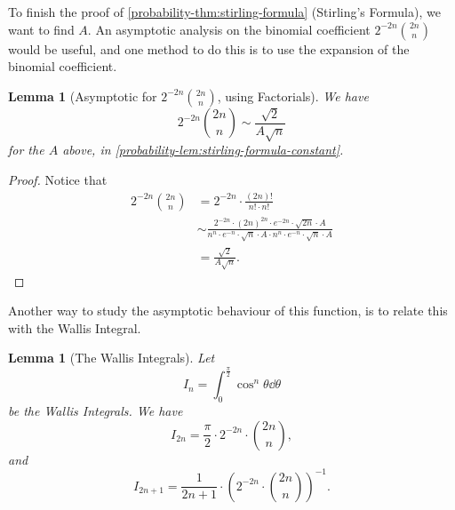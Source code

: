 \documentclass[11pt]{article}
\numberwithin{equation}{section}
\newtheorem{lemma}[theorem]{Lemma}
\theoremstyle{definition}
\theoremstyle{remark}
\newcommand{\pqty}[1]{\left(#1\right)}
\newcommand{\inverse}{^{-1}}
\begin{document}
To finish the proof of \autoref{probability-thm:stirling-formula} (Stirling's Formula), we want to find \(A\). An asymptotic analysis on the binomial coefficient \(2^{-2n} \binom{2n}{n}\) would be useful, and one method to do this is to use the expansion of the binomial coefficient.

\begin{lemma}[Asymptotic for \(2^{-2n} \binom{2n}{n}\), using Factorials]\label{probability-lemma-003}
    \label{probability-lem:asymptotic-binomial-factorial}%
    We have
    \[
        2^{-2n} \binom{2n}{n} \sim \frac{\sqrt{2}}{A \sqrt{n}}
    \]
    for the \(A\) above, in \autoref{probability-lem:stirling-formula-constant}.
\end{lemma}

\begin{proof}\label{probability-proof-004}
    Notice that
    \begin{align*}
        2^{-2n} \binom{2n}{n} &= 2^{-2n} \cdot \frac{\pqty{2n}!}{n! \cdot n!} \\
        &\sim \frac{2^{-2n} \cdot \pqty{2n}^{2n} \cdot e^{-2n} \cdot \sqrt{2n} \cdot A}{n^n \cdot e^{-n} \cdot \sqrt{n} \cdot A \cdot n^n \cdot e^{-n} \cdot \sqrt{n} \cdot A} \\
        &= \frac{\sqrt{2}}{A \sqrt{n}}.
    \end{align*}
\end{proof}

Another way to study the asymptotic behaviour of this function, is to relate this with the Wallis Integral.

\begin{lemma}[The Wallis Integrals]\label{probability-lemma-004}
    \label{probability-lem:wallis-integral}%
    Let
    \[
        I_n = \int_{0}^{\frac{\pi}{2}} \cos^n \theta \dd{\theta}
    \]
    be the Wallis Integrals. We have
    \[
        I_{2n} = \frac{\pi}{2} \cdot 2^{-2n} \cdot \binom{2n}{n},
    \]
    and
    \[
        I_{2n + 1} = \frac{1}{2n + 1} \cdot \pqty{2^{-2n} \cdot \binom{2n}{n}}\inverse.
    \]
\end{lemma}
\end{document}
